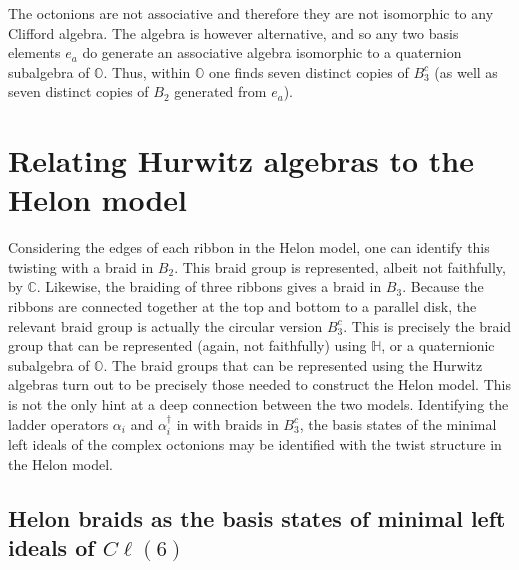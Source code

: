 \documentclass[a4paper]{jpconf}
\begin{document}
The octonions are not associative and therefore they are not isomorphic to any Clifford algebra. The algebra is however alternative, and so any two basis elements $e_a$ do generate an associative algebra isomorphic to a quaternion subalgebra of $\mathbb{O}$. Thus, within $\mathbb{O}$ one finds seven distinct copies of $B_3^c$ (as well as seven distinct copies of $B_2$ generated from $e_a$).

\section{Relating Hurwitz algebras to the Helon model}

Considering the edges of each ribbon in the Helon model, one can identify this twisting with a braid in $B_2$. This braid group is represented, albeit not faithfully, by $\mathbb{C}$. Likewise, the braiding of three ribbons gives a braid in $B_3$. Because the ribbons are connected together at the top and bottom to a parallel disk, the relevant braid group is actually the circular version $B_3^c$. This is precisely the braid group that can be represented (again, not faithfully) using $\mathbb{H}$, or a quaternionic subalgebra of $\mathbb{O}$. The braid groups that can be represented using the Hurwitz algebras turn out to be precisely those needed to construct the Helon model. This is not the only hint at a deep connection between the two models. Identifying the ladder operators $\alpha_i$ and $\alpha_i^{\dagger}$ in \cite{furey2016standard} with braids in $B_3^c$, the basis states of the minimal left ideals of the complex octonions may be identified with the twist structure in the Helon model.
\subsection{Helon braids as the basis states of minimal left ideals of $C\ell(6)$}\label{braidedbasiststates}
\end{document}
